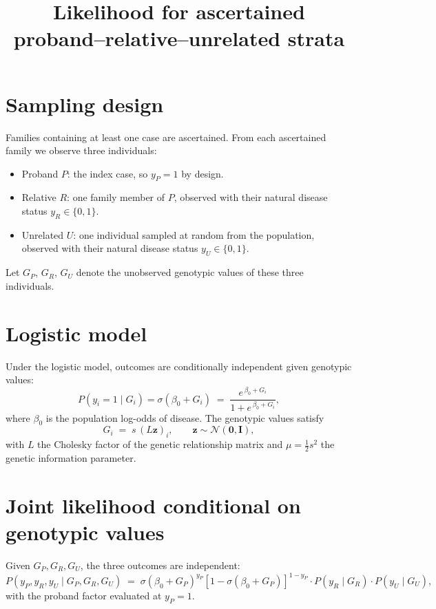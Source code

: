 \documentclass[12pt]{article}
\title{Likelihood for ascertained proband--relative--unrelated strata}
\author{}
\date{}
\begin{document}
\maketitle

\section*{Sampling design}

Families containing at least one case are ascertained.  From each ascertained
family we observe three individuals:
\begin{itemize}
  \item Proband $P$: the index case, so $y_P = 1$ by design.
  \item Relative $R$: one family member of $P$, observed with their natural
        disease status $y_R \in \{0,1\}$.
  \item Unrelated $U$: one individual sampled at random from the population,
        observed with their natural disease status $y_U \in \{0,1\}$.
\end{itemize}
Let $G_P$, $G_R$, $G_U$ denote the unobserved genotypic values of these three
individuals.

\section*{Logistic model}

Under the logistic model, outcomes are conditionally independent given genotypic
values:
\[
  P(y_i = 1 \mid G_i) = \sigma(\beta_0 + G_i)
  \;=\; \frac{e^{\,\beta_0 + G_i}}{1 + e^{\,\beta_0 + G_i}},
\]
where $\beta_0$ is the population log-odds of disease.  The genotypic values
satisfy
\[
  G_i \;=\; s\,(L\bm{z})_i, \qquad \bm{z} \sim \mathcal{N}(\bm{0},\bm{I}),
\]
with $L$ the Cholesky factor of the genetic relationship matrix and
$\mu = \tfrac{1}{2}s^2$ the genetic information parameter.

\section*{Joint likelihood conditional on genotypic values}

Given $G_P, G_R, G_U$, the three outcomes are independent:
\begin{equation}
  P(y_P, y_R, y_U \mid G_P, G_R, G_U)
  \;=\;
  \sigma(\beta_0 + G_P)^{y_P}[1-\sigma(\beta_0+G_P)]^{1-y_P}
  \cdot
  P(y_R \mid G_R)
  \cdot
  P(y_U \mid G_U),
\end{equation}
with the proband factor evaluated at $y_P = 1$.
\end{document}
